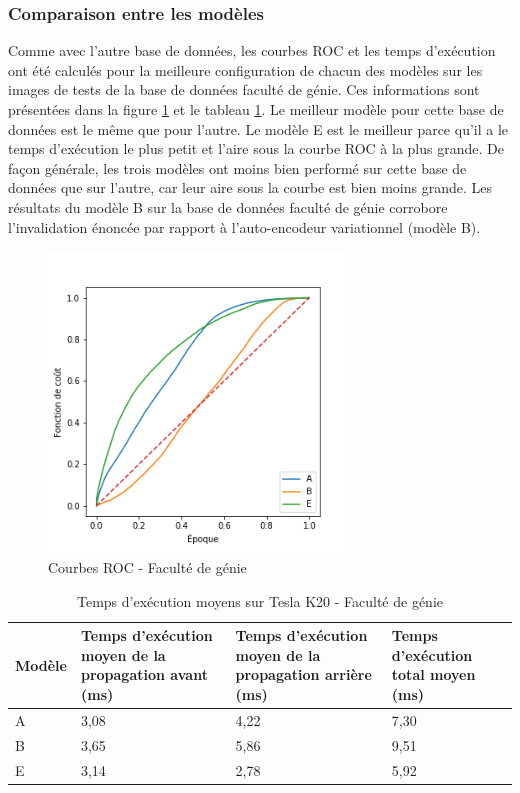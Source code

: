 \subsubsection{Comparaison entre les modèles}
    Comme avec l'autre base de données, les courbes ROC et les temps d'exécution ont été calculés pour la meilleure configuration de chacun des modèles sur les images de tests de la base de données faculté de génie. Ces informations sont présentées dans la figure \ref{fig:corridor_roc} et le tableau \ref{tab:resultat_corridor_temps_execution}. Le meilleur modèle pour cette base de données est le même que pour l'autre. Le modèle E est le meilleur parce qu'il a le temps d'exécution le plus petit et l'aire sous la courbe ROC à la plus grande. De façon générale, les trois modèles ont moins bien performé sur cette base de données que sur l'autre, car leur aire sous la courbe est bien moins grande. Les résultats du modèle B sur la base de données faculté de génie corrobore l'invalidation énoncée par rapport à l'auto-encodeur variationnel (modèle B).
    
    \begin{figure}[H]
        \centering
        \includegraphics[width=8cm]{images/corridor_roc.png}
        \caption{Courbes ROC - Faculté de génie}
        \label{fig:corridor_roc}
    \end{figure}

    \begin{table}[H]
        \centering
        \caption{Temps d'exécution moyens sur Tesla K20 - Faculté de génie}
        \label{tab:resultat_corridor_temps_execution}
        \begin{tabular}{lp{4cm}p{4cm}p{4cm}}
            \midrule
            Modèle & Temps d'exécution moyen de la propagation avant (ms) & Temps d'exécution moyen de la propagation arrière (ms) & Temps d'exécution total moyen (ms)\\
            \midrule\midrule
            A & 3,08 & 4,22 & 7,30\\
            B & 3,65 & 5,86 & 9,51\\
            E & 3,14 & 2,78 & 5,92\\
            \midrule
        \end{tabular}
    \end{table}
    
